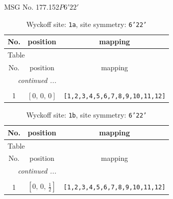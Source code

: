 \documentclass[fleqn,8pt]{jsarticle}
\begin{document}
\setcounter{MaxMatrixCols}{32}

\renewcommand{\tablename}{Table~}
\renewcommand{\figurename}{Figure~}
\begin{center}
\LARGE
MSG No. 177.152\quad$P6'22'$
\end{center}
\renewcommand{\arraystretch}{1.2}
\begin{longtable}{ccc}
\caption{Wyckoff site: {\tt 1a}, site symmetry: {\tt 6'22'}}
 \\
 \hline \hline
No. & position & mapping \\ \hline \endfirsthead

\multicolumn{2}{l}{\tablename\ \thetable{}} \\
 \hline \hline
No. & position & mapping \\ \hline \endhead

 \hline \hline
\multicolumn{2}{r}{\footnotesize\it continued ...} \\ \endfoot

 \hline \hline
\multicolumn{2}{r}{} \\ \endlastfoot

1 & $\left[ 0,\, 0,\, 0 \right]$ & {\tt [1,2,3,4,5,6,7,8,9,10,11,12]} \\
\end{longtable}
\renewcommand{\arraystretch}{1.2}
\begin{longtable}{ccc}
\caption{Wyckoff site: {\tt 1b}, site symmetry: {\tt 6'22'}}
 \\
 \hline \hline
No. & position & mapping \\ \hline \endfirsthead

\multicolumn{2}{l}{\tablename\ \thetable{}} \\
 \hline \hline
No. & position & mapping \\ \hline \endhead

 \hline \hline
\multicolumn{2}{r}{\footnotesize\it continued ...} \\ \endfoot

 \hline \hline
\multicolumn{2}{r}{} \\ \endlastfoot

1 & $\left[ 0,\, 0,\, \frac{1}{2} \right]$ & {\tt [1,2,3,4,5,6,7,8,9,10,11,12]} \\
\end{longtable}
\renewcommand{\arraystretch}{1.2}
\end{document}
